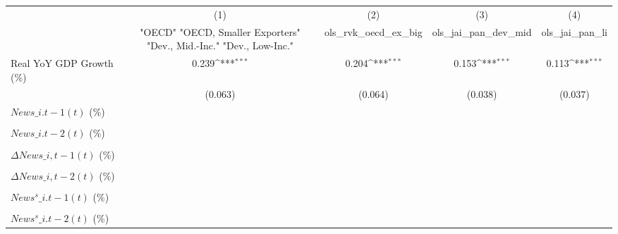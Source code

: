 {
\def\sym#1{\ifmmode^{#1}\else\(^{#1}\)\fi}
\begin{tabular}{l*{4}{c}}
\toprule
                    &\multicolumn{1}{c}{(1)}&\multicolumn{1}{c}{(2)}&\multicolumn{1}{c}{(3)}&\multicolumn{1}{c}{(4)}\\
                    &\multicolumn{1}{c}{ "OECD" "OECD, Smaller Exporters" "Dev., Mid.-Inc." "Dev., Low-Inc."}&\multicolumn{1}{c}{ols\_rvk\_oecd\_ex\_big}&\multicolumn{1}{c}{ols\_jai\_pan\_dev\_mid}&\multicolumn{1}{c}{ols\_jai\_pan\_li}\\
\midrule
Real YoY GDP Growth (\%)&       0.239\sym{***}&       0.204\sym{***}&       0.153\sym{***}&       0.113\sym{***}\\
                    &     (0.063)         &     (0.064)         &     (0.038)         &     (0.037)         \\
\addlinespace
$ News\_{i.t-1}(t)$ (\%)&                     &                     &                     &                     \\
                    &                     &                     &                     &                     \\
\addlinespace
$ News\_{i.t-2}(t)$ (\%)&                     &                     &                     &                     \\
                    &                     &                     &                     &                     \\
\addlinespace
$ \Delta News\_{i,t-1}(t)$ (\%)&                     &                     &                     &                     \\
                    &                     &                     &                     &                     \\
\addlinespace
$ \Delta News\_{i,t-2}(t)$ (\%)&                     &                     &                     &                     \\
                    &                     &                     &                     &                     \\
\addlinespace
$ News^s\_{i.t-1}(t)$ (\%)&                     &                     &                     &                     \\
                    &                     &                     &                     &                     \\
\addlinespace
$ News^s\_{i.t-2}(t)$ (\%)&                     &                     &                     &                     \\

\end{tabular}}
